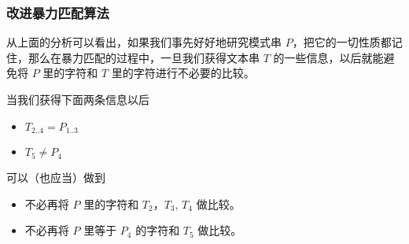 \documentclass{ctexbeamer}
\begin{document}
\begin{frame}
  \frametitle{改进暴力匹配算法}
从上面的分析可以看出，如果我们{\kaishu 事先好好地研究模式串 $P$，把它的一切性质都记住}，那么在暴力匹配的过程中，一旦我们获得文本串 $T$ 的一些信息，以后就能避免将 $P$ 里的字符和 $T$ 里的字符进行{\kaishu 不必要的比较}。 


当我们获得下面两条信息以后
  \begin{itemize}
    \item $T_{2..4} = P_{1..3}$
    \item $T_5 \ne P_4$
  \end{itemize}
可以（也应当）做到
\begin{itemize}
  \item 不必再将 $P$ 里的字符和 $T_{2}$，$T_{3}$, $T_{4}$ 做比较。
  \item 不必再将 $P$ 里等于 $P_4$ 的字符和 $T_5$ 做比较。
\end{itemize}
\end{frame}
\end{document}

